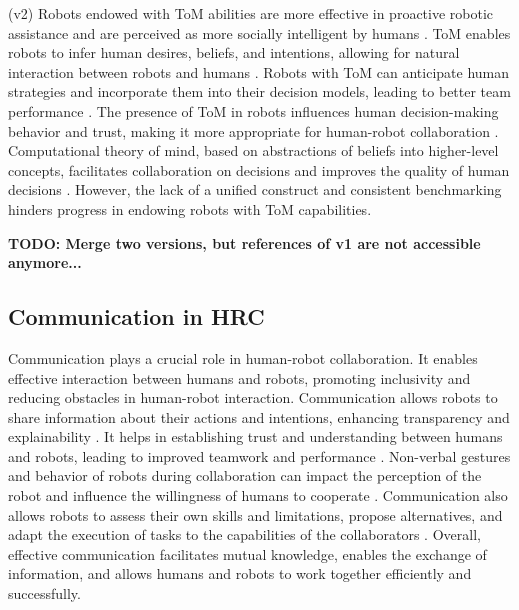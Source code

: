     (v2) Robots endowed with ToM abilities are more effective in proactive robotic assistance and are perceived as more socially intelligent by humans \cite{shvo_proactive_2022}. ToM enables robots to infer human desires, beliefs, and intentions, allowing for natural interaction between robots and humans \cite{yu_robot_2023}. Robots with ToM can anticipate human strategies and incorporate them into their decision models, leading to better team performance \cite{romeo_exploring_2022}. The presence of ToM in robots influences human decision-making behavior and trust, making it more appropriate for human-robot collaboration \cite{schlobach_abstracting_2022}. Computational theory of mind, based on abstractions of beliefs into higher-level concepts, facilitates collaboration on decisions and improves the quality of human decisions \cite{gurney_robots_2022}. However, the lack of a unified construct and consistent benchmarking hinders progress in endowing robots with ToM capabilities.

    \textbf{TODO: Merge two versions, but references of v1 are not accessible anymore...}

    
    \subsection{Communication in HRC}

    Communication plays a crucial role in human-robot collaboration. It enables effective interaction between humans and robots, promoting inclusivity and reducing obstacles in human-robot interaction. Communication allows robots to share information about their actions and intentions, enhancing transparency and explainability \cite{mcmillan_human-robot_2023}. It helps in establishing trust and understanding between humans and robots, leading to improved teamwork and performance \cite{verhagen_influence_2022}. Non-verbal gestures and behavior of robots during collaboration can impact the perception of the robot and influence the willingness of humans to cooperate \cite{arntz_collaborating_2022}. Communication also allows robots to assess their own skills and limitations, propose alternatives, and adapt the execution of tasks to the capabilities of the collaborators \cite{ferrari_bidirectional_2022}. Overall, effective communication facilitates mutual knowledge, enables the exchange of information, and allows humans and robots to work together efficiently and successfully.


